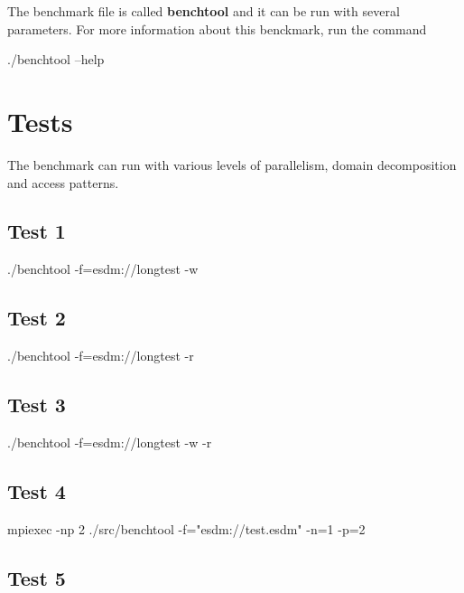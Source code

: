 The benchmark file is called \textbf{benchtool} and it can be run with several parameters. For more information about this benckmark, run the command

\begin{framed}
./benchtool --help
\end{framed}

\section{Tests}

The benchmark can run with various levels of parallelism, domain decomposition and access patterns.

\subsection{Test 1}

./benchtool -f=esdm://longtest -w

\subsection{Test 2}

./benchtool -f=esdm://longtest -r

\subsection{Test 3}

./benchtool -f=esdm://longtest -w -r

\subsection{Test 4}

mpiexec -np 2 ./src/benchtool -f="esdm://test.esdm" -n=1 -p=2

\subsection{Test 5}

